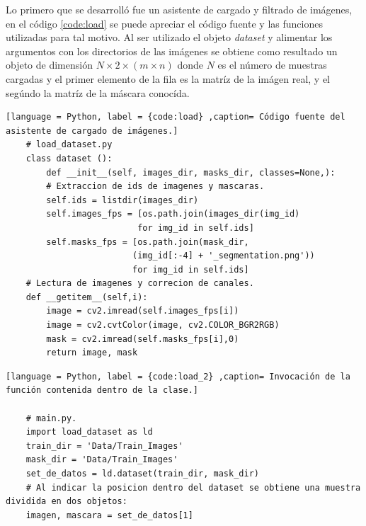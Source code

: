 Lo primero que se desarrolló fue un asistente de cargado y filtrado de imágenes, en el código \ref{code:load} se puede apreciar el código fuente y las funciones utilizadas para tal motivo. Al ser utilizado el objeto \emph{dataset} y alimentar los argumentos con los directorios de las imágenes se obtiene como resultado un objeto de dimensión $N \times 2 \times (m \times n)$ donde $N$ es el número de muestras cargadas y el primer elemento de la fila es la matríz de la imágen real, y el segúndo la matríz de la máscara conocída.

\renewcommand{\lstlistingname}{Código}

\lstset{style=pystyle}
\begin{lstlisting}[language = Python, label = {code:load} ,caption= Código fuente del asistente de cargado de imágenes.]
    # load_dataset.py
    class dataset ():
        def __init__(self, images_dir, masks_dir, classes=None,):
        # Extraccion de ids de imagenes y mascaras.
        self.ids = listdir(images_dir)
        self.images_fps = [os.path.join(images_dir(img_id)
                          for img_id in self.ids]
        self.masks_fps = [os.path.join(mask_dir,
                         (img_id[:-4] + '_segmentation.png'))
                         for img_id in self.ids]
    # Lectura de imagenes y correcion de canales.
    def __getitem__(self,i):
        image = cv2.imread(self.images_fps[i])
        image = cv2.cvtColor(image, cv2.COLOR_BGR2RGB)
        mask = cv2.imread(self.masks_fps[i],0)
        return image, mask
\end{lstlisting}

\begin{lstlisting}[language = Python, label = {code:load_2} ,caption= Invocación de la función contenida dentro de la clase.]

    # main.py.
    import load_dataset as ld 
    train_dir = 'Data/Train_Images'
    mask_dir = 'Data/Train_Images'
    set_de_datos = ld.dataset(train_dir, mask_dir)
    # Al indicar la posicion dentro del dataset se obtiene una muestra dividida en dos objetos:
    imagen, mascara = set_de_datos[1]

\end{lstlisting}

